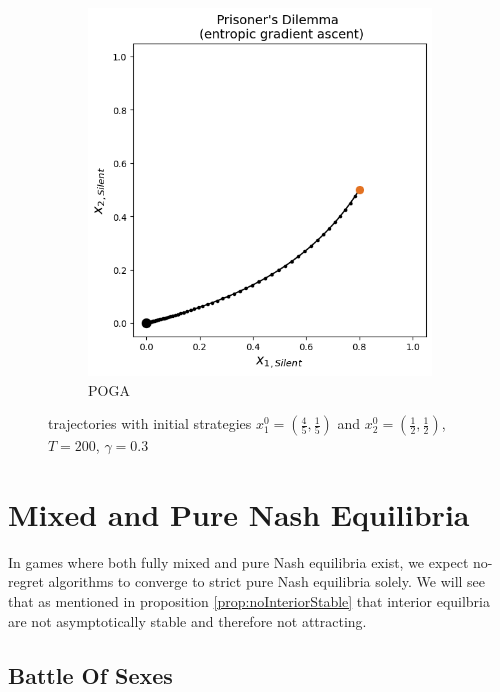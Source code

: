 \begin{figure}[H]
\begin{subfigure}{.5\textwidth}
    \includegraphics[width=\textwidth]{logos/Prisoner5.png}
    \caption{POGA}
\end{subfigure}
\caption{trajectories with initial strategies $x_{1}^0 = (\frac{4}{5},\frac{1}{5})$ and $x_{2}^0 = (\frac{1}{2},\frac{1}{2})$, $T = 200$, $\gamma = 0.3$}
\label{fig:Prisoner2}
\end{figure}


\section{Mixed and Pure Nash Equilibria}\label{section:MixedandPureNashEquilibria}

In games where both fully mixed and pure Nash equilibria exist, we expect no-regret algorithms to converge to strict pure Nash equilibria solely. We will see that as mentioned in proposition \ref{prop:noInteriorStable} that interior equilbria are not asymptotically stable and therefore not attracting.

\subsection{Battle Of Sexes}\label{subsection:battleOfSexes}

